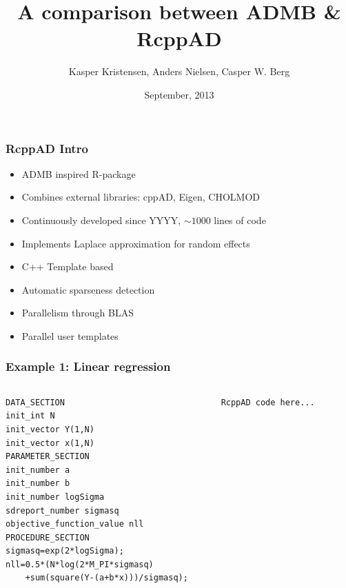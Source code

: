 \documentclass[compress]{beamer}
\title[RcppAD]
{A comparison between ADMB \& RcppAD}
\author[K. Kristensen, A. Nielsen, C.W. Berg ]%
{Kasper Kristensen, Anders Nielsen, Casper W. Berg}
\date[September 2013] %
{September, 2013}
\begin{document}
\begin{frame}[plain]
  \titlepage
\end{frame}

\begin{frame}
\frametitle{RcppAD Intro}

\begin{itemize}
  \item ADMB inspired R-package
  \item Combines external libraries: cppAD, Eigen, CHOLMOD
  \item Continuously developed since YYYY, $\sim 1000$ lines of code
  \item Implements Laplace approximation for random effects
  \item C++ Template based
  \item Automatic sparseness detection
  \item Parallelism through BLAS
  \item Parallel user templates
\end{itemize}


\end{frame}

\begin{frame}[fragile]
  \frametitle{Example 1: Linear regression}
\begin{columns}
    \begin{column}{0.5\textwidth}
\tiny{
\begin{verbatim}
DATA_SECTION
init_int N
init_vector Y(1,N)
init_vector x(1,N)
PARAMETER_SECTION
init_number a
init_number b
init_number logSigma
sdreport_number sigmasq
objective_function_value nll
PROCEDURE_SECTION
sigmasq=exp(2*logSigma);
nll=0.5*(N*log(2*M_PI*sigmasq)
    +sum(square(Y-(a+b*x)))/sigmasq);
\end{verbatim}
}
    \end{column}
\hspace{-50pt}
\vrule{}
    \begin{column}{0.5\textwidth} 
   \tiny{
    \begin{verbatim}
RcppAD code here...    
    \end{verbatim}
}

\end{column}
\end{columns}
\end{frame}
\end{document}
